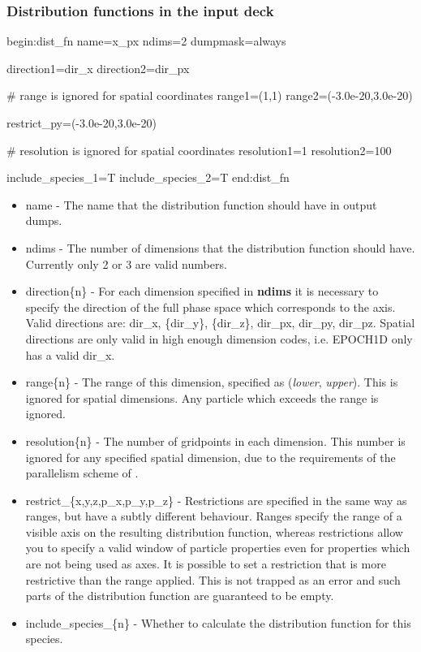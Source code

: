 \documentclass[12pt,a4paper]{article}
\newcommand{\EPOCH}{{\color{warwickdark}\fontfamily{phv}\selectfont{EPOCH}}}
\newenvironment{boxverbatim}{\lboxverbatim{none}}{\endlboxverbatim}
\begin{document}
\subsubsection{Distribution functions in the input deck}
\begin{boxverbatim}
begin:dist_fn
   name=x_px
   ndims=2
   dumpmask=always

   direction1=dir_x
   direction2=dir_px

   # range is ignored for spatial coordinates
   range1=(1,1)
   range2=(-3.0e-20,3.0e-20)

   restrict_py=(-3.0e-20,3.0e-20)

   # resolution is ignored for spatial coordinates
   resolution1=1
   resolution2=100

   include_species_1=T
   include_species_2=T
end:dist_fn
\end{boxverbatim}
\begin{itemize}
\item name - The name that the distribution function should have in output
  dumps.
\item ndims - The number of dimensions that the distribution function should
  have. Currently only 2 or 3 are valid numbers.
\item direction\{n\} - For each dimension specified in {\bf ndims} it is
  necessary to specify the direction of the full phase space which corresponds
  to the axis. Valid directions are: dir\_x, \{dir\_y\}, \{dir\_z\}, dir\_px,
  dir\_py, dir\_pz. Spatial directions are only valid in high enough dimension
  codes, i.e. EPOCH1D only has a valid dir\_x.
\item range\{n\} - The range of this dimension, specified as ({\it lower},{\it
    upper}). This is ignored for spatial dimensions. Any particle which exceeds
  the range is ignored.
\item resolution\{n\} - The number of gridpoints in each dimension. This
  number is ignored for any specified spatial dimension, due to the
  requirements of the parallelism scheme of {\EPOCH}.
\item restrict\_\{x,y,z,p\_x,p\_y,p\_z\} - Restrictions are specified in the
  same way as ranges, but have a subtly different behaviour. Ranges specify
  the range of a visible axis on the resulting distribution function, whereas
  restrictions allow you to specify a valid window of particle properties even
  for properties which are not being used as axes. It is possible to set a
  restriction that is more restrictive than the range applied. This is not
  trapped as an error and such parts of the distribution function are
  guaranteed to be empty.
\item include\_species\_\{n\} - Whether to calculate the distribution function
  for this species.
\end{itemize}
\end{document}
